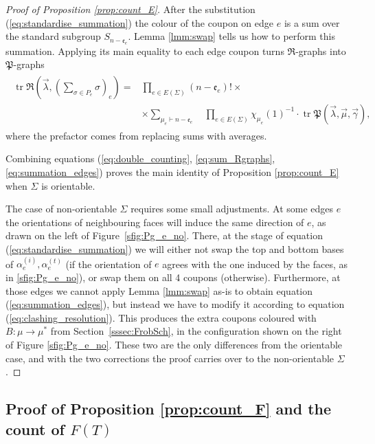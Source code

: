 \documentclass{amsart}
\newcommand{\tr}{\operatorname{tr}}
\begin{document}
\begin{proof}[Proof of Proposition \ref{prop:count_E}]
After the substitution (\ref{eq:standardise_summation}) the colour of the coupon on edge $e$ is a sum over the standard subgroup $S_{n-\mathfrak{e}_e}$. Lemma \ref{lmm:swap} tells us how to perform this summation. Applying its main equality to each edge coupon turns $\mathfrak{R}$-graphs into $\mathfrak{P}$-graphs
\begin{align}\begin{split}\label{eq:summation_edges}
\tr\mathfrak{R}\left(\vec\lambda,\left(\sum_{\sigma\in P_e}\sigma\right)_e\right)=&\prod_{e\in E(\Sigma)}(n-\mathfrak{e}_e)!\times\\
&\times\sum_{\mu_e\vdash n-\mathfrak{e}_e}\quad\prod_{e\in E(\Sigma)}\chi_{\mu_e}(1)^{-1}\cdot\tr\mathfrak{P}\left(\vec\lambda,\vec\mu,\vec\gamma\right),
\end{split}\end{align}
where the prefactor comes from replacing sums with averages.

Combining equations (\ref{eq:double_counting}, \ref{eq:sum_Rgraphs}, \ref{eq:summation_edges}) proves the main identity of Proposition \ref{prop:count_E} when $\Sigma$ is orientable.

The case of non-orientable $\Sigma$ requires some small adjustments. At some edges $e$ the orientations of neighbouring faces will induce the same direction of $e$, as drawn on the left of Figure~\ref{sfig:Pg_e_no}. There, at the stage of equation (\ref{eq:standardise_summation}) we will either not swap the top and bottom bases of $\alpha^{(i)}_e,\alpha^{(t)}_e$ (if the orientation of $e$ agrees with the one induced by the faces, as in \ref{sfig:Pg_e_no}), or swap them on all 4 coupons (otherwise). Furthermore, at those edges we cannot apply Lemma \ref{lmm:swap} as-is to obtain equation (\ref{eq:summation_edges}), but instead we have to modify it according to equation (\ref{eq:clashing_resolution}). This produces the extra coupons coloured with $B\colon\mu\to\mu^*$ from Section~\ref{sssec:FrobSch}, in the configuration shown on the right of Figure \ref{sfig:Pg_e_no}. These two are the only differences from the orientable case, and with the two corrections the proof carries over to the non-orientable $\Sigma$.
\end{proof}

\subsection{Proof of Proposition \ref{prop:count_F} and the count of $F(T)$}\label{ssec:pf_F}
\end{document}

